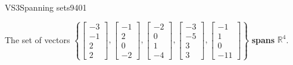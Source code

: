 \begin{exercise}{VS3}{Spanning sets}{9401}
\begin{exerciseAnswer}
 

 The set of vectors \(\left\{ \left[\begin{array}{c}
-3 \\
-1 \\
2 \\
2
\end{array}\right] , \left[\begin{array}{c}
-1 \\
2 \\
0 \\
-2
\end{array}\right] , \left[\begin{array}{c}
-2 \\
0 \\
1 \\
-4
\end{array}\right] , \left[\begin{array}{c}
-3 \\
-5 \\
3 \\
3
\end{array}\right] , \left[\begin{array}{c}
-1 \\
1 \\
0 \\
-11
\end{array}\right] \right\}\) \textbf{spans} \(\mathbb{R}^4\). 

 \end{exerciseAnswer}
 \end{exercise}


